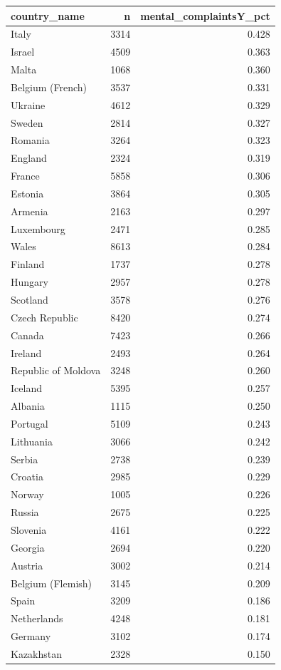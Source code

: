 \documentclass[
]{article}
\begin{document}
\begin{longtable}[]{@{}lrr@{}}
\toprule\noalign{}
country\_name & n & mental\_complaintsY\_pct \\
\midrule\noalign{}
\endhead
\bottomrule\noalign{}
\endlastfoot
Italy & 3314 & 0.428 \\
Israel & 4509 & 0.363 \\
Malta & 1068 & 0.360 \\
Belgium (French) & 3537 & 0.331 \\
Ukraine & 4612 & 0.329 \\
Sweden & 2814 & 0.327 \\
Romania & 3264 & 0.323 \\
England & 2324 & 0.319 \\
France & 5858 & 0.306 \\
Estonia & 3864 & 0.305 \\
Armenia & 2163 & 0.297 \\
Luxembourg & 2471 & 0.285 \\
Wales & 8613 & 0.284 \\
Finland & 1737 & 0.278 \\
Hungary & 2957 & 0.278 \\
Scotland & 3578 & 0.276 \\
Czech Republic & 8420 & 0.274 \\
Canada & 7423 & 0.266 \\
Ireland & 2493 & 0.264 \\
Republic of Moldova & 3248 & 0.260 \\
Iceland & 5395 & 0.257 \\
Albania & 1115 & 0.250 \\
Portugal & 5109 & 0.243 \\
Lithuania & 3066 & 0.242 \\
Serbia & 2738 & 0.239 \\
Croatia & 2985 & 0.229 \\
Norway & 1005 & 0.226 \\
Russia & 2675 & 0.225 \\
Slovenia & 4161 & 0.222 \\
Georgia & 2694 & 0.220 \\
Austria & 3002 & 0.214 \\
Belgium (Flemish) & 3145 & 0.209 \\
Spain & 3209 & 0.186 \\
Netherlands & 4248 & 0.181 \\
Germany & 3102 & 0.174 \\
Kazakhstan & 2328 & 0.150 \\
\end{longtable}
\end{document}
